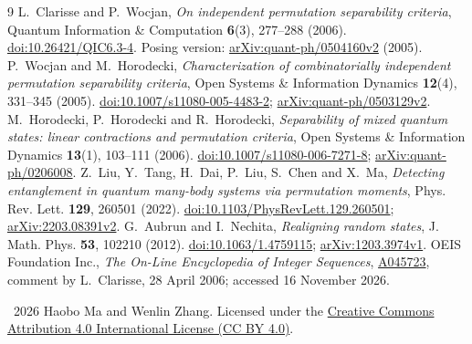 \documentclass[11pt]{article}
\begin{document}
\begin{thebibliography}{9}
L.~Clarisse and P.~Wocjan,
\emph{On independent permutation separability criteria},
Quantum Information \& Computation \textbf{6}(3), 277--288 (2006).
\href{https://doi.org/10.26421/QIC6.3-4}{doi:10.26421/QIC6.3-4}.
Posing version: \href{https://arxiv.org/abs/quant-ph/0504160v2}{arXiv:quant-ph/0504160v2} (2005).
P.~Wocjan and M.~Horodecki,
\emph{Characterization of combinatorially independent permutation
separability criteria}, Open Systems \& Information Dynamics
\textbf{12}(4), 331--345 (2005).
\href{https://doi.org/10.1007/s11080-005-4483-2}{doi:10.1007/s11080-005-4483-2};
\href{https://arxiv.org/abs/quant-ph/0503129v2}{arXiv:quant-ph/0503129v2}.
M.~Horodecki, P.~Horodecki and R.~Horodecki,
\emph{Separability of mixed quantum states: linear contractions and
permutation criteria}, Open Systems \& Information Dynamics
\textbf{13}(1), 103--111 (2006).
\href{https://doi.org/10.1007/s11080-006-7271-8}{doi:10.1007/s11080-006-7271-8};
\href{https://arxiv.org/abs/quant-ph/0206008}{arXiv:quant-ph/0206008}.
Z.~Liu, Y.~Tang, H.~Dai, P.~Liu, S.~Chen and X.~Ma,
\emph{Detecting entanglement in quantum many-body systems via permutation
moments}, Phys. Rev. Lett. \textbf{129}, 260501 (2022).
\href{https://doi.org/10.1103/PhysRevLett.129.260501}{doi:10.1103/PhysRevLett.129.260501};
\href{https://arxiv.org/abs/2203.08391v2}{arXiv:2203.08391v2}.
G.~Aubrun and I.~Nechita,
\emph{Realigning random states}, J. Math. Phys. \textbf{53}, 102210 (2012).
\href{https://doi.org/10.1063/1.4759115}{doi:10.1063/1.4759115};
\href{https://arxiv.org/abs/1203.3974v1}{arXiv:1203.3974v1}.
OEIS Foundation Inc., \emph{The On-Line Encyclopedia of Integer Sequences},
\href{https://oeis.org/A045723}{A045723}, comment by L.~Clarisse,
28 April 2006; accessed 16 November 2026.
\end{thebibliography}

\medskip\noindent\small
\textcopyright\ 2026 Haobo Ma and Wenlin Zhang.
Licensed under the \href{https://creativecommons.org/licenses/by/4.0/}{Creative Commons Attribution 4.0 International License (CC BY 4.0)}.
\end{document}
